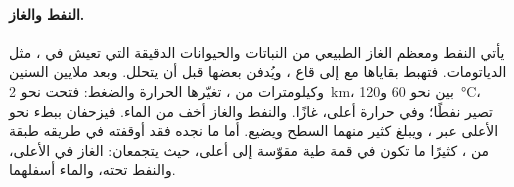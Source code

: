 \paragraph{النفط والغاز.} يأتي النفط ومعظم الغاز الطبيعي من النباتات
والحيوانات الدقيقة التي تعيش في ، مثل الدياتومات. فتهبط بقاياها
مع  إلى قاع ، ويُدفن بعضها قبل أن يتحلل. وبعد ملايين السنين
وكيلومترات من ، تغيّرها الحرارة والضغط: فتحت نحو \qty{2}{km}،
بين نحو 60 و\qty{120}{\degreeCelsius}، تصير نفطًا؛ وفي حرارة أعلى،
غازًا. والنفط والغاز أخف من الماء. فيزحفان ببطء نحو الأعلى عبر 
 ، ويبلغ كثير منهما السطح ويضيع. أما ما نجده فقد أوقفته
في طريقه طبقة من  ، كثيرًا ما تكون في قمة طية مقوّسة إلى أعلى،
حيث يتجمعان: الغاز في الأعلى، والنفط تحته، والماء
أسفلهما.

